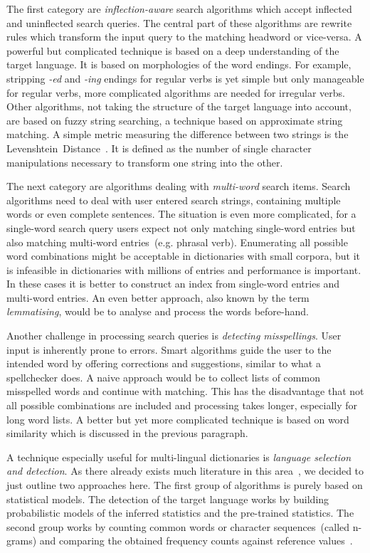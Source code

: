\documentclass[draft,final]{vutinfth} %
\begin{document}
The first category are \textit{inflection-aware} search algorithms which accept inflected and uninflected search queries. The central part of these algorithms are rewrite rules which transform the input query to the matching headword or vice-versa. A powerful but complicated technique is based on a deep understanding of the target language. It is based on morphologies of the word endings. For example, stripping \emph{-ed} and \emph{-ing} endings for regular verbs is yet simple but only manageable for regular verbs, more complicated algorithms are needed for irregular verbs. Other algorithms, not taking the structure of the target language into account, are based on fuzzy string searching, a technique based on approximate string matching. A simple metric measuring the difference between two strings is the Levenshtein~Distance~\cite{levenshtein1966}. It is defined as the number of single character manipulations necessary to transform one string into the other. 

The next category are algorithms dealing with \textit{multi-word} search items. Search algorithms need to deal with user entered search strings, containing multiple words or even complete sentences. The situation is even more complicated, for a single-word search query users expect not only matching single-word entries but also matching multi-word entries~(e.g. phrasal verb). Enumerating all possible word combinations might be acceptable in dictionaries with small corpora, but it is infeasible in dictionaries with millions of entries and performance is important. In these cases it is better to construct an index from single-word entries and multi-word entries. An even better approach, also known by the term \emph{lemmatising}, would be to analyse and process the words before-hand.

Another challenge in processing search queries is \textit{detecting misspellings}. User input is inherently prone to errors. Smart algorithms guide the user to the intended word by offering corrections and suggestions, similar to what a spellchecker does. A naive approach would be to collect lists of common misspelled words and continue with matching. This has the disadvantage that not all possible combinations are included and processing takes longer, especially for long word lists. A better but yet more complicated technique is based on word similarity which is discussed in the previous paragraph. 

A technique especially useful for multi-lingual dictionaries is \textit{language selection and detection}. As there already exists much literature in this area~\cite{mcnamee2005, lodhi2002, vatanen2010, selamat2016}, we decided to just outline two approaches here. The first group of algorithms is purely based on statistical models. The detection of the target language works by building probabilistic models of the inferred statistics and the pre-trained statistics. The second group works by counting common words or character sequences~(called n-grams) and comparing the obtained frequency counts against reference values~\cite{mcnamee2005}.
\end{document}
